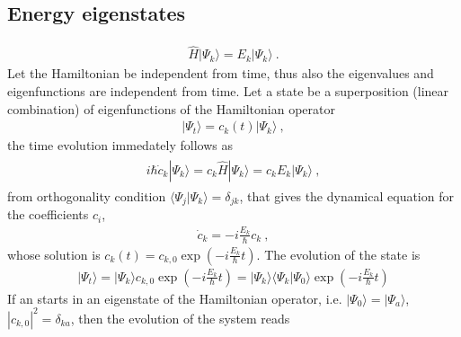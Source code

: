 \documentclass[letterpaper,10pt,english]{jupyterBook}
\begin{document}
\subsection{Energy eigen\sphinxhyphen{}states}
\label{\detokenize{ch/quantum-mechanics/wave-mechanics:energy-eigen-states}}\begin{equation*}
\begin{split}\hat{H} | \Psi_k \rangle = E_k | \Psi_k \rangle \ .\end{split}
\end{equation*}
\sphinxAtStartPar
Let the Hamiltonian be independent from time, thus also the eigenvalues and eigenfunctions are independent from time. Let a state be a superposition (linear combination) of eigenfunctions of the Hamiltonian operator
\begin{equation*}
\begin{split}| \Psi_t \rangle = c_{k}(t) | \Psi_k \rangle \ ,\end{split}
\end{equation*}
\sphinxAtStartPar
the time evolution immedately follows as
\begin{equation*}
\begin{split}\begin{aligned}
  i \hbar \dot{c}_k | \Psi_k \rangle = c_k \hat{H} | \Psi_k \rangle = c_k E_k | \Psi_k \rangle \ ,
\end{aligned}\end{split}
\end{equation*}
\sphinxAtStartPar
from orthogonality condition \(\langle \Psi_j | \Psi_k \rangle = \delta_{jk}\), that gives the dynamical equation for the coefficients \(c_i\),
\begin{equation*}
\begin{split}\dot{c}_k = - i \frac{E_k}{\hbar} c_k \ ,\end{split}
\end{equation*}
\sphinxAtStartPar
whose solution is \(c_k(t) = c_{k,0} \exp \left( - i \frac{E_k}{\hbar} t \right)\). The evolution of the state is
\begin{equation*}
\begin{split}| \Psi_t \rangle = | \Psi_k \rangle c_{k,0} \exp\left( - i \frac{E_k}{\hbar} t \right) = | \Psi_k \rangle \langle \Psi_k | \Psi_0 \rangle \exp\left( - i \frac{E_k}{\hbar} t \right)\end{split}
\end{equation*}
\sphinxAtStartPar
{} If an  starts in an eigen\sphinxhyphen{}state of the Hamiltonian operator, i.e. \(| \Psi_0 \rangle = | \Psi_a \rangle\), \(|c_{k,0}|^2 = \delta_{ka}\), then the evolution of the system reads
\end{document}
